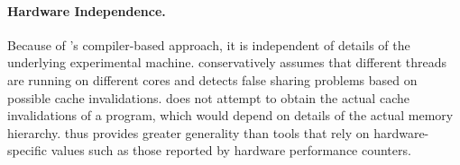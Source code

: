\paragraph{Hardware Independence.} Because of \Predator{}'s compiler-based approach, it is independent of details of the underlying experimental machine. \Predator{} conservatively assumes that different threads are running on different cores and detects false sharing problems based on possible cache invalidations. \Predator{} does not attempt to obtain the actual cache invalidations of a program, which would depend on details of the actual memory hierarchy. \Predator{} thus provides greater generality than tools that rely on hardware-specific values such as those reported by hardware performance counters.

